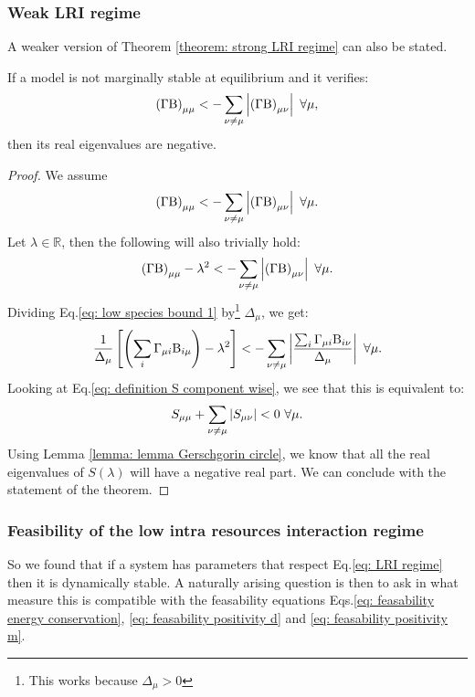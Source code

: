 \documentclass[12pt, titlepage]{report}
\begin{document}
\subsubsection{Weak LRI regime}
A weaker version of Theorem \ref{theorem: strong LRI regime} can also be stated.
\begin{theorem}\label{theorem: weak LRI regime}
If a model is not marginally stable at equilibrium and it verifies:
\begin{equation}
\left(\Gamma \text{B}\right)_{\mu\mu} < - \sum_{\nu \neq \mu } \left|{\left(\Gamma \text{B}\right)_{\mu \nu}}\right| \ \forall \mu,
\end{equation}
then its real eigenvalues are negative.
\end{theorem}
\begin{proof}
We assume
\begin{equation}
\left(\Gamma \text{B}\right)_{\mu\mu} < - \sum_{\nu \neq \mu } \left|{\left(\Gamma \text{B}\right)_{\mu \nu}}\right|  \ \forall \mu.
\end{equation}
Let $\lambda \in \mathbb{R}$, then the following will also trivially hold:
\begin{equation}
  \left(\Gamma\Beta \right)_{\mu\mu} -\lambda^2 < - \sum_{\nu \neq \mu } \abs{\left(\Gamma \Beta\right)_{\mu \nu}} \ \forall \mu. \label{eq: low species bound 1}
\end{equation}
Dividing Eq.\eqref{eq: low species bound 1} by\footnote{This works because $\Delta_\mu > 0$} $\Delta_\mu$, we get:
\begin{equation}
\frac{1}{\Delta_\mu}\left[\left(\sum_i \Gamma_{\mu i} \Beta_{i \mu} \right)-{\lambda^2}\right] < - \sum_{\nu \neq \mu } \abs{\frac{\sum_i \Gamma_{\mu i}\Beta_{i\nu}}{\Delta_\mu}} \ \forall \mu.
\end{equation}
Looking at Eq.\eqref{eq: definition S component wise}, we see that this is equivalent to:
\begin{equation}
S_{\mu \mu} + \sum_{\nu \neq \mu} \left|{S_{\mu \nu}}\right| < 0\ \forall \mu.
\end{equation}
Using Lemma \ref{lemma: lemma Gerschgorin circle}, we know that all the real eigenvalues of $S(\lambda)$ will have a negative real part.
We can conclude with the statement of the theorem.
\end{proof}



\subsubsection{Feasibility of the low intra resources interaction regime}
So we found that if a system has parameters that respect Eq.\eqref{eq: LRI regime} then it is dynamically stable. A naturally arising question is then to ask in what measure this is compatible with the feasability equations Eqs.\eqref{eq: feasability energy conservation}, \eqref{eq: feasability positivity d} and \eqref{eq: feasability positivity m}.
\end{document}
